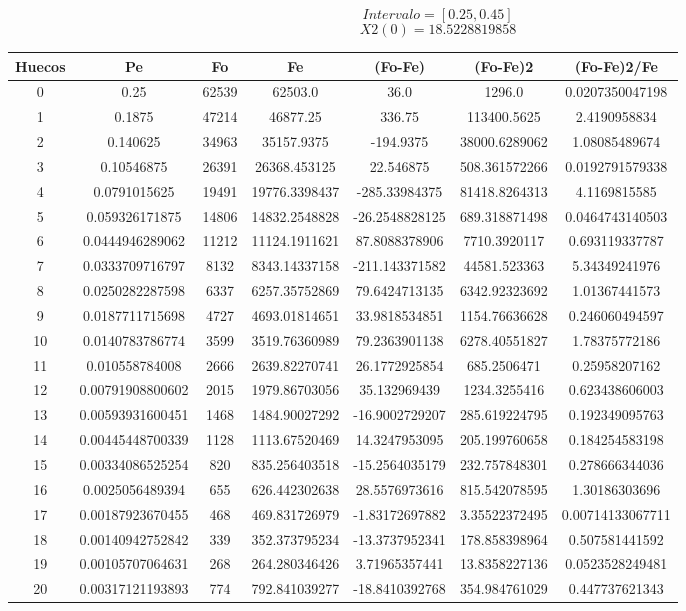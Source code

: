 \documentclass{article}
\begin{document}
$$
Intervalo = [0.25, 0.45]
$$
$$
X2(0) = 18.5228819858
$$
\begin{tabular}{|c|c|c|c|c|c|c|}
Huecos&Pe&Fo&Fe&(Fo{-}Fe)&(Fo{-}Fe)2&(Fo{-}Fe)2/Fe\\
\hline
0&0.25&62539&62503.0&36.0&1296.0&0.0207350047198\\
\hline
1&0.1875&47214&46877.25&336.75&113400.5625&2.4190958834\\
\hline
2&0.140625&34963&35157.9375&{-}194.9375&38000.6289062&1.08085489674\\
\hline
3&0.10546875&26391&26368.453125&22.546875&508.361572266&0.0192791579338\\
\hline
4&0.0791015625&19491&19776.3398437&{-}285.33984375&81418.8264313&4.1169815585\\
\hline
5&0.059326171875&14806&14832.2548828&{-}26.2548828125&689.318871498&0.0464743140503\\
\hline
6&0.0444946289062&11212&11124.1911621&87.8088378906&7710.3920117&0.693119337787\\
\hline
7&0.0333709716797&8132&8343.14337158&{-}211.143371582&44581.523363&5.34349241976\\
\hline
8&0.0250282287598&6337&6257.35752869&79.6424713135&6342.92323692&1.01367441573\\
\hline
9&0.0187711715698&4727&4693.01814651&33.9818534851&1154.76636628&0.246060494597\\
\hline
10&0.0140783786774&3599&3519.76360989&79.2363901138&6278.40551827&1.78375772186\\
\hline
11&0.010558784008&2666&2639.82270741&26.1772925854&685.2506471&0.25958207162\\
\hline
12&0.00791908800602&2015&1979.86703056&35.132969439&1234.3255416&0.623438606003\\
\hline
13&0.00593931600451&1468&1484.90027292&{-}16.9002729207&285.619224795&0.192349095763\\
\hline
14&0.00445448700339&1128&1113.67520469&14.3247953095&205.199760658&0.184254583198\\
\hline
15&0.00334086525254&820&835.256403518&{-}15.2564035179&232.757848301&0.278666344036\\
\hline
16&0.0025056489394&655&626.442302638&28.5576973616&815.542078595&1.30186303696\\
\hline
17&0.00187923670455&468&469.831726979&{-}1.83172697882&3.35522372495&0.00714133067711\\
\hline
18&0.00140942752842&339&352.373795234&{-}13.3737952341&178.858398964&0.507581441592\\
\hline
19&0.00105707064631&268&264.280346426&3.71965357441&13.8358227136&0.0523528249481\\
\hline
20&0.00317121193893&774&792.841039277&{-}18.8410392768&354.984761029&0.447737621343\\
\end{tabular}
\end{document}
